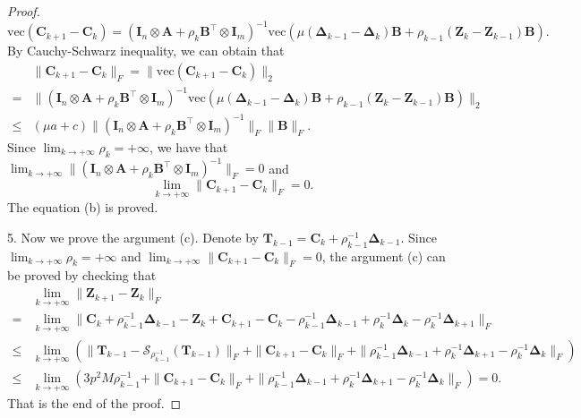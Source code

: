 \begin{proof}
\begin{equation}
\label{e13}
\text{vec}(\bm{C}_{k+1} - \bm{C}_{k})
=
(\bm{I}_{n}\otimes\mathbf{A}
+
\rho_{k}\bm{B}^{\top}\otimes\mathbf{I}_{m})^{-1}
\text{vec}(\mu(\bm{\Delta}_{k-1}-\bm{\Delta}_{k})\bm{B}+\rho_{k-1}(\bm{Z}_{k}-\bm{Z}_{k-1})\bm{B}).
\end{equation}
By Cauchy-Schwarz inequality, we can obtain that
\begin{align}
&
\|
\bm{C}_{k+1}
-
\bm{C}_{k}
\|_{F}
=
\|
\text{vec}(\bm{C}_{k+1} - \bm{C}_{k})
\|_{2}
\\
=
&
\|
(\bm{I}_{n}\otimes\mathbf{A}
+
\rho_{k}\bm{B}^{\top}\otimes\mathbf{I}_{m})^{-1}
\text{vec}(\mu(\bm{\Delta}_{k-1}-\bm{\Delta}_{k})\bm{B}+\rho_{k-1}(\bm{Z}_{k}-\bm{Z}_{k-1})\bm{B})
\|_{2}
\\
\le
&
(
\mu
a
+
c
)
\|
(\bm{I}_{n}\otimes\mathbf{A}
+
\rho_{k}\bm{B}^{\top}\otimes\mathbf{I}_{m})^{-1}
\|_{F}
\|
\bm{B}
\|_{F}.
\end{align}
Since $\lim_{k \to +\infty}\rho_{k}=+\infty$, we have that 
$\lim_{k \to +\infty} 
\|
(\bm{I}_{n}\otimes\mathbf{A}
+
\rho_{k}\bm{B}^{\top}\otimes\mathbf{I}_{m})^{-1}
\|_{F}=0$ 
and 
\begin{equation}
\lim_{k \to +\infty} 
\|
\bm{C}_{k+1}-\bm{C}_{k}
\|_{F}
=
0.
\end{equation}
The equation (b) is proved. 


5. Now we prove the argument (c). Denote by $\bm{T}_{k-1}=\bm{C}_{k}+\rho_{k-1}^{-1}\bm{\Delta}_{k-1}$. Since $\lim_{k \to +\infty}\rho_{k}=+\infty$ and $\lim_{k \to +\infty} \|\bm{C}_{k+1}-\bm{C}_{k}\|_{F}=0$, the argument (c) can be proved by checking that 
\begin{align}
&\lim_{k \to +\infty} 
\|
\bm{Z}_{k+1}-\bm{Z}_{k}
\|_{F}
\\
=
&
\lim_{k \to +\infty} 
\|
\bm{C}_{k}+\rho_{k-1}^{-1}\bm{\Delta}_{k-1}-\bm{Z}_{k}
+
\bm{C}_{k+1}-\bm{C}_{k}
-
\rho_{k-1}^{-1}
\bm{\Delta}_{k-1}
+
\rho_{k}^{-1}
\bm{\Delta}_{k}
-
\rho_{k}^{-1}
\bm{\Delta}_{k+1}
\|_{F}
\\
\le
&
\lim_{k \to +\infty} 
(
\|
\bm{T}_{k-1}-\mathcal{S}_{\rho_{k-1}^{-1}}(\bm{T}_{k-1})
\|_{F}
+
\|
\bm{C}_{k+1}-\bm{C}_{k}
\|_{F}
+
\|
\rho_{k-1}^{-1}\bm{\Delta}_{k-1}
+
\rho_{k}^{-1}\bm{\Delta}_{k+1}
-
\rho_{k}^{-1}\bm{\Delta}_{k}
\|_{F}
)
\\
\le
&
\lim_{k \to +\infty} 
(
3p^2M\rho_{k-1}^{-1}
+
\|
\bm{C}_{k+1}-\bm{C}_{k}
\|_{F}
+
\|
\rho_{k-1}^{-1}\bm{\Delta}_{k-1}
+
\rho_{k}^{-1}\bm{\Delta}_{k+1}
-
\rho_{k}^{-1}\bm{\Delta}_{k}
\|_{F}
)
=
0
.
\end{align}
That is the end of the proof.
\end{proof}



